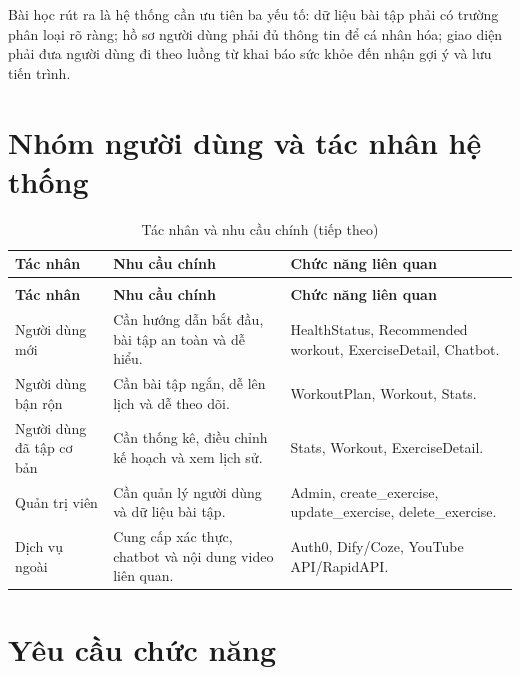 Bài học rút ra là hệ thống cần ưu tiên ba yếu tố: dữ liệu bài tập phải có trường phân loại rõ ràng; hồ sơ người dùng phải đủ thông tin để cá nhân hóa; giao diện phải đưa người dùng đi theo luồng từ khai báo sức khỏe đến nhận gợi ý và lưu tiến trình.


\section{Nhóm người dùng và tác nhân hệ thống}

\begingroup
\setlength{\tabcolsep}{3pt}
\renewcommand{\arraystretch}{1.25}
\begin{longtable}{|P{0.220\textwidth}|P{0.330\textwidth}|P{0.370\textwidth}|}
\caption{Tác nhân và nhu cầu chính}\\
\hline
\textbf{Tác nhân} & \textbf{Nhu cầu chính} & \textbf{Chức năng liên quan} \\
\hline
\endfirsthead
\caption[]{Tác nhân và nhu cầu chính (tiếp theo)}\\
\hline
\textbf{Tác nhân} & \textbf{Nhu cầu chính} & \textbf{Chức năng liên quan} \\
\hline
\endhead
Người dùng mới & Cần hướng dẫn bắt đầu, bài tập an toàn và dễ hiểu. & HealthStatus, Recommended workout, ExerciseDetail, Chatbot. \\
\hline
Người dùng bận rộn & Cần bài tập ngắn, dễ lên lịch và dễ theo dõi. & WorkoutPlan, Workout, Stats. \\
\hline
Người dùng đã tập cơ bản & Cần thống kê, điều chỉnh kế hoạch và xem lịch sử. & Stats, Workout, ExerciseDetail. \\
\hline
Quản trị viên & Cần quản lý người dùng và dữ liệu bài tập. & Admin, create\_exercise, update\_exercise, delete\_exercise. \\
\hline
Dịch vụ ngoài & Cung cấp xác thực, chatbot và nội dung video liên quan. & Auth0, Dify/Coze, YouTube API/RapidAPI. \\
\hline
\end{longtable}
\endgroup

\section{Yêu cầu chức năng}

